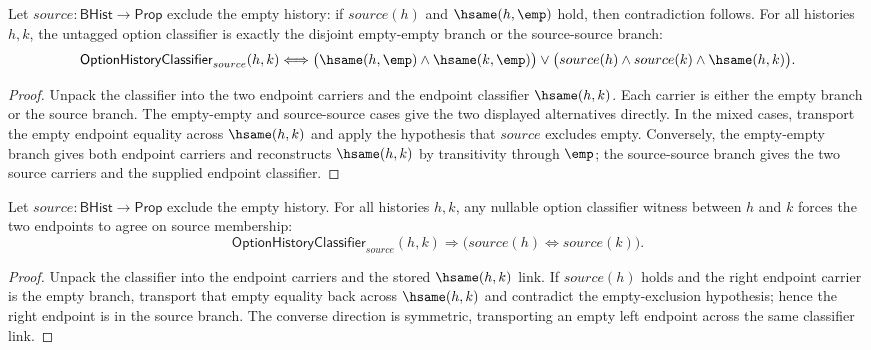 \begin{theorem}
\label{thm:option-history-classifier-exclusive-branch-iff}
Let $source:\mathsf{BHist}\to\mathsf{Prop}$ exclude the empty history:
if $source(h)$ and $\hsame(h,\emp)$ hold, then contradiction follows. For all
histories $h,k$, the untagged option classifier is exactly the disjoint
empty-empty branch or the source-source branch:
$$
\mathsf{OptionHistoryClassifier}_{source}(h,k)
\Longleftrightarrow
\bigl(\hsame(h,\emp)\land\hsame(k,\emp)\bigr)
\lor
\bigl(source(h)\land source(k)\land\hsame(h,k)\bigr).
$$
\end{theorem}
\begin{proof}
Unpack the classifier into the two endpoint carriers and the endpoint
classifier $\hsame(h,k)$. Each carrier is either the empty branch or the source
branch. The empty-empty and source-source cases give the two displayed
alternatives directly. In the mixed cases, transport the empty endpoint equality
across $\hsame(h,k)$ and apply the hypothesis that $source$ excludes empty.
Conversely, the empty-empty branch gives both endpoint carriers and reconstructs
$\hsame(h,k)$ by transitivity through $\emp$; the source-source branch gives the
two source carriers and the supplied endpoint classifier.
\end{proof}

\begin{theorem}
\label{thm:option-history-classifier-source-branch-iff}
Let $source:\mathsf{BHist}\to\mathsf{Prop}$ exclude the empty history. For all
histories $h,k$, any nullable option classifier witness between $h$ and $k$
forces the two endpoints to agree on source membership:
$$
\mathsf{OptionHistoryClassifier}_{source}(h,k)
\Longrightarrow
\bigl(source(h)\Longleftrightarrow source(k)\bigr).
$$
\end{theorem}
\begin{proof}
Unpack the classifier into the endpoint carriers and the stored
$\hsame(h,k)$ link. If $source(h)$ holds and the right endpoint carrier is the
empty branch, transport that empty equality back across $\hsame(h,k)$ and
contradict the empty-exclusion hypothesis; hence the right endpoint is in the
source branch. The converse direction is symmetric, transporting an empty left
endpoint across the same classifier link.
\end{proof}

